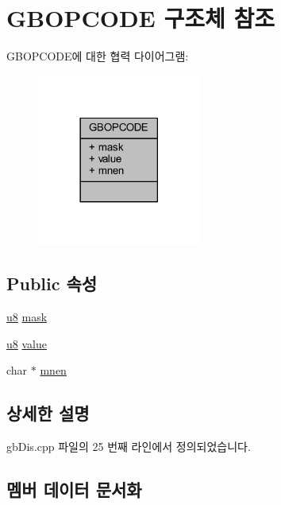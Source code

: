 \hypertarget{struct_g_b_o_p_c_o_d_e}{}\section{G\+B\+O\+P\+C\+O\+DE 구조체 참조}
\label{struct_g_b_o_p_c_o_d_e}


G\+B\+O\+P\+C\+O\+D\+E에 대한 협력 다이어그램\+:\nopagebreak
\begin{figure}[H]
\begin{center}
\leavevmode
\includegraphics[width=153pt]{struct_g_b_o_p_c_o_d_e__coll__graph}
\end{center}
\end{figure}
\subsection*{Public 속성}
\begin{DoxyCompactItemize}
\item 
\mbox{\hyperlink{_system_8h_aed742c436da53c1080638ce6ef7d13de}{u8}} \mbox{\hyperlink{struct_g_b_o_p_c_o_d_e_afb18b1f0b688b4274a48b425b65942d4}{mask}}
\item 
\mbox{\hyperlink{_system_8h_aed742c436da53c1080638ce6ef7d13de}{u8}} \mbox{\hyperlink{struct_g_b_o_p_c_o_d_e_a7a595245e5b9550b3ad680a89e5f010d}{value}}
\item 
char $\ast$ \mbox{\hyperlink{struct_g_b_o_p_c_o_d_e_ac9518919dba6fed9895f2e41fb61b6ca}{mnen}}
\end{DoxyCompactItemize}


\subsection{상세한 설명}


gb\+Dis.\+cpp 파일의 25 번째 라인에서 정의되었습니다.



\subsection{멤버 데이터 문서화}
\mbox{\label{struct_g_b_o_p_c_o_d_e_afb18b1f0b688b4274a48b425b65942d4}} 
